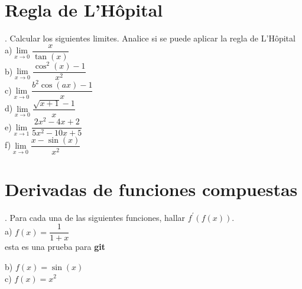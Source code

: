 \documentclass[letterpaper]{article}
\newcommand{\fp}[1]{#1^{\prime}}
\begin{document}
\section*{Regla de L’Hôpital}

. Calcular los siguientes limites. Analice si se puede aplicar la regla de L’Hôpital\\

a)$ \lim\limits_{ x \rightarrow 0} \dfrac{x}{\tan(x)} $\\


b)$ \lim\limits_{ x \rightarrow 0} \dfrac{\cos^{2}(x) -1}{x^{2}} $\\


c)$ \lim\limits_{ x \rightarrow 0} \dfrac{b^{2}\cos(ax) -1}{x} $\\


d)$ \lim\limits_{ x \rightarrow 0} \dfrac{\sqrt{x+1} -1}{x} $\\


e)$ \lim\limits_{ x \rightarrow 1} \dfrac{2x^{2}-4x+2}{5x^{2}-10x+5} $\\


f)$ \lim\limits_{ x \rightarrow 0} \dfrac{x- \sin(x)}{x^{2}} $\\


\section*{Derivadas de funciones compuestas}

. Para cada una de las siguientes funciones, hallar $ \fp{f} (f (x)) $.\\

a) $ f(x) = \dfrac{1}{1+x} $\\

esta es una prueba para \textbf{git}


b) $ f(x) = \sin(x) $\\


c) $ f(x) = x^{2} $\\
\end{document}
